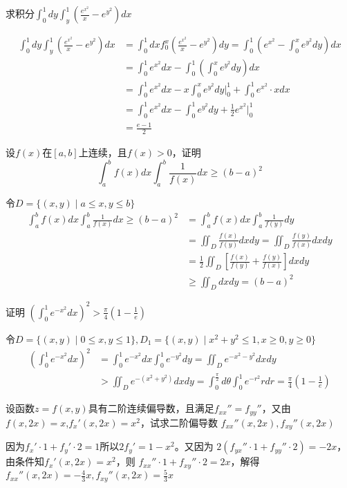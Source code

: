 \documentclass{article}
\begin{document}
\begin{examplle}[]
求积分\(\int_0^1dy\int_y^1\left(\frac{e^{x^2}}{x}-e^{y^2}\right)dx\)

\begin{align*}
\int_0^1dy\int_y^1\left(\frac{e^{x^2}}{x}-e^{y^2}\right)dx&=
\int_0^1dxf_0^x\left(\frac{e^{x^2}}{x}-e^{y^2}\right)dy=
\int_0^1(e^{x^2}-\int_0^xe^{y^2}dy)dx\\
&=\int_0^1e^{x^2}dx-\int_0^1(\int_0^xe^{y^2}dy)dx\\&=
\int_0^1e^{x^2}dx-x\int_0^xe^{y^2}dy\Big\rvert_0^1+
\int_0^1e^{x^2}\cdot xdx\\
&=\int_0^1e^{x^2}dx-\int_0^1e^{y^2}dy+\frac{1}{2}e^{x^2}\Big\rvert_0^1\\
&=\frac{e-1}{2}
\end{align*}
\end{examplle}

\begin{examplle}[]
设\(f(x)\)在\([a,b]\)上连续，且\(f(x)>0\)，证明
\begin{equation*}
\int_a^bf(x)dx\int_a^b\frac{1}{f(x)}dx\ge(b-a)^2
\end{equation*}

令\(D=\{(x,y)\mid a\le x,y\le b\}\)
\begin{align*}
\int_a^bf(x)dx\int_a^b\frac{1}{f(x)}dx\ge(b-a)^2&=
\int_a^bf(x)dx\int_a^b\frac{1}{f(y)}dy\\
&=\iint_D\frac{f(x)}{f(y)}dxdy=\iint_D\frac{f(y)}{f(x)}dxdy\\
&=\frac{1}{2}\iint_D\left[\frac{f(x)}{f(y)}+\frac{f(y)}{f(x)}\right]dxdy\\
&\ge\iint_Ddxdy=(b-a)^2
\end{align*}
\end{examplle}

\begin{examplle}[]
证明
\(\left(\int_0^1e^{-x^2}dx\right)^2>\frac{\pi}{4}(1-\frac{1}{e})\)

令\(D=\{(x,y)\mid0\le x,y\le1\},D_1=\{(x,y)\mid x^2+y^2\le1,x\ge0,y\ge0\}\)
\begin{align*}
\left(\int_0^1e^{-x^2}dx\right)^2&=
\int_0^1e^{-x^2}dx\int_0^1e^{-y^2}dy=\iint_De^{-x^2-y^2}dxdy\\
&>\iint_De^{-(x^2+y^2)}dxdy=\int_0^{\frac{\pi}{2}}d\theta\int_0^1e^{-r^2}rdr=\frac{\pi}{4}(1-\frac{1}{e})
\end{align*}
\end{examplle}

\begin{examplle}[]
设函数\(z=f(x,y)\)具有二阶连续偏导数，且满足\(f_{xx}''=f_{yy}''\)，又由
\(f(x,2x)=x\),\(f_x'(x,2x)=x^2\)，试求二阶偏导数
\(f_{xx}''(x,2x),f_{xy}''(x,2x)\)

因为\(f_x'\cdot1+f_y'\cdot2=1\)所以\(2f_y'=1-x^2\)。又因为
\(2(f_{yx}''\cdot1+f_{yy}''\cdot2) =-2x\)，由条件知\(f_x'(x,2x)=x^2\)，则
\(f_{xx}''\cdot1+f_{xy}''\cdot2=2x\)，解得
\(f_{xx}''(x,2x)=-\frac{4}{3}x,f_{xy}''(x,2x)=\frac{5}{3}x\)
\end{examplle}
\end{document}
